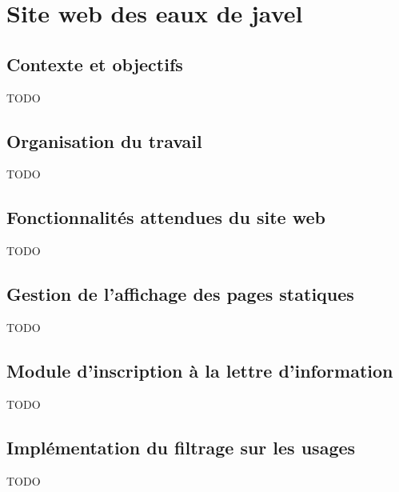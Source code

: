 \section{Site web des eaux de javel \alc}

\subsection{Contexte et objectifs}

TODO

\subsection{Organisation du travail}

TODO

\subsection{Fonctionnalités attendues du site web}

TODO

\subsection{Gestion de l'affichage des pages statiques}

TODO

\subsection{Module d'inscription à la lettre d'information}

TODO

\subsection{Implémentation du filtrage sur les usages}

TODO
